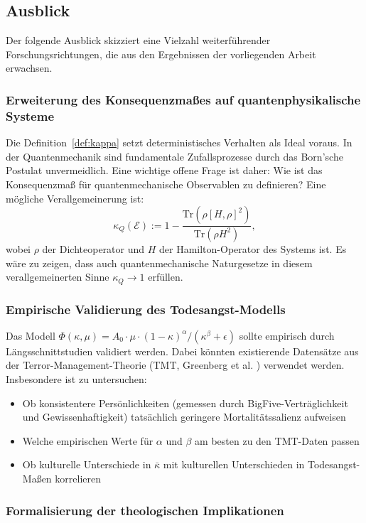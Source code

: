 ﻿\documentclass[a4paper,12pt]{article}
\theoremstyle{definition}
\begin{document}
\subsection{Ausblick}

Der folgende Ausblick skizziert eine Vielzahl weiterführender Forschungsrichtungen, die aus den Ergebnissen der vorliegenden Arbeit erwachsen.

\subsubsection{Erweiterung des Konsequenzmaßes auf quantenphysikalische Systeme}

Die Definition~\ref{def:kappa} setzt deterministisches Verhalten als Ideal voraus. In der Quantenmechanik sind fundamentale Zufallsprozesse durch das Born'sche Postulat unvermeidlich. Eine wichtige offene Frage ist daher: Wie ist das Konsequenzmaß für quantenmechanische Observablen zu definieren? Eine mögliche Verallgemeinerung ist:
\[
\kappa_Q(\mathcal{E}) := 1 - \frac{\text{Tr}(\rho [H, \rho]^2)}{\text{Tr}(\rho H^2)},
\]
wobei $\rho$ der Dichteoperator und $H$ der Hamilton-Operator des Systems ist. Es wäre zu zeigen, dass auch quantenmechanische Naturgesetze in diesem verallgemeinerten Sinne $\kappa_Q \to 1$ erfüllen.

\subsubsection{Empirische Validierung des Todesangst-Modells}

Das Modell $\Phi(\kappa, \mu) = A_0 \cdot \mu \cdot (1-\kappa)^\alpha / (\kappa^\beta + \epsilon)$ sollte empirisch durch Längsschnittstudien validiert werden. Dabei könnten existierende Datensätze aus der Terror-Management-Theorie (TMT, Greenberg et al. \cite{greenberg1986}) verwendet werden. Insbesondere ist zu untersuchen:
\begin{itemize}
\item Ob konsistentere Persönlichkeiten (gemessen durch BigFive-Verträglichkeit und Gewissenhaftigkeit) tatsächlich geringere Mortalitätssalienz aufweisen
\item Welche empirischen Werte für $\alpha$ und $\beta$ am besten zu den TMT-Daten passen
\item Ob kulturelle Unterschiede in $\bar{\kappa}$ mit kulturellen Unterschieden in Todesangst-Maßen korrelieren
\end{itemize}

\subsubsection{Formalisierung der theologischen Implikationen}
\end{document}
